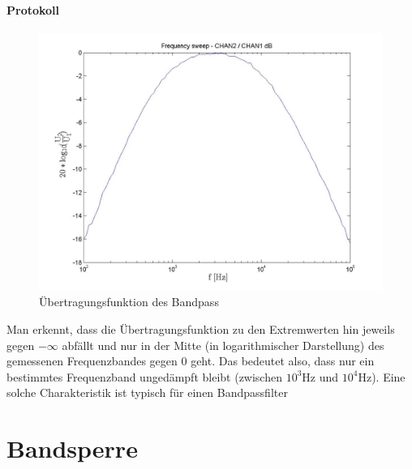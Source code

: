 \documentclass[10pt]{scrreprt}
\begin{document}
    \paragraph{Protokoll}
    \begin{center}
        \begin{figure}[H]
            \includegraphics[width=\textwidth]{FS_53_frequencysweep_ylogxlog.jpg}
            \caption{Übertragungsfunktion des Bandpass}
        \end{figure}
    \end{center}
    Man erkennt, dass die Übertragungsfunktion zu den Extremwerten hin jeweils
    gegen $-\infty$ abfällt und nur in der Mitte (in logarithmischer Darstellung)
    des gemessenen Frequenzbandes  gegen 0 geht. Das bedeutet also, dass nur ein
    bestimmtes Frequenzband ungedämpft bleibt (zwischen $10^3\si{\hertz}$ und
    $10^4\si{\hertz}$). Eine solche Charakteristik ist typisch für einen Bandpassfilter

    \section{Bandsperre}
\end{document}
